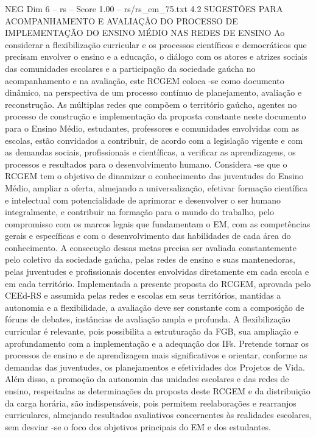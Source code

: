 \begin{textsample}{NEG Dim 6 – rs – Score 1.00 – rs/rs\_em\_75.txt}  \label{ex:f6_neg_108}
4.2 SUGESTÕES PARA ACOMPANHAMENTO E AVALIAÇÃO DO PROCESSO DE IMPLEMENTAÇÃO DO ENSINO MÉDIO NAS REDES DE ENSINO Ao considerar a flexibilização curricular e os processos científicos e democráticos que precisam envolver o ensino e a educação, o diálogo com os atores e atrizes sociais das comunidades escolares e a participação da sociedade gaúcha no acompanhamento e na avaliação, este RCGEM coloca -se como documento dinâmico, na perspectiva de um processo contínuo de planejamento, avaliação e reconstrução.
As múltiplas redes que compõem o território gaúcho, agentes no processo de construção e implementação da proposta constante neste documento para o Ensino Médio, estudantes, professores e comunidades envolvidas com as escolas, estão convidados a contribuir, de acordo com a legislação vigente e com as demandas sociais, profissionais e científicas, a verificar as aprendizagens, os processos e resultados para o desenvolvimento humano.
Considera -se que o RCGEM tem o objetivo de dinamizar o conhecimento das juventudes do Ensino Médio, ampliar a oferta, almejando a universalização, efetivar formação científica e intelectual com potencialidade de aprimorar e desenvolver o ser humano integralmente, e contribuir na formação para o mundo do trabalho, pelo compromisso com os marcos legais que fundamentam o EM, com as competências gerais e específicas e com o desenvolvimento das habilidades de cada área do conhecimento.
A consecução dessas metas precisa ser avaliada constantemente pelo coletivo da sociedade gaúcha, pelas redes de ensino e suas mantenedoras, pelas juventudes e profissionais docentes envolvidas diretamente em cada escola e em cada território.
Implementada a presente proposta do RCGEM, aprovada pelo CEEd-RS e assumida pelas redes e escolas em seus territórios, mantidas a autonomia e a flexibilidade, a avaliação deve ser constante com a composição de fóruns de debates, instâncias de avaliação ampla e profunda.
A flexibilização curricular é relevante, pois possibilita a estruturação da FGB, sua ampliação e aprofundamento com a implementação e a adequação dos IFs.
Pretende tornar os processos de ensino e de aprendizagem mais significativos e orientar, conforme as demandas das juventudes, os planejamentos e efetividades dos Projetos de Vida.
Além disso, a promoção da autonomia das unidades escolares e das redes de ensino, respeitadas as determinações da proposta deste RCGEM e da distribuição da carga horária, são indispensáveis, pois permitem reelaborações e rearranjos curriculares, almejando resultados avaliativos concernentes às realidades escolares, sem desviar -se o foco dos objetivos principais do EM e dos estudantes.

\end{textsample}
